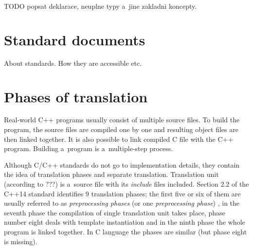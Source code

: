 \documentclass[nolot,nolof,nocover,printed]{fithesis3}
\begin{document}



\ifshowoldstuff


TODO popsat deklarace, neuplne typy a~jine zakladni koncepty.


\section{Standard documents}

About standards. How they are accessible etc.

\section{Phases of translation}
\label{txt:phases-of-translation}
Real-world C++ programs usually consist of multiple source files. To build the program, the source files are compiled one by one and resulting object files are then linked together. It is also possible to link compiled C file with the C++ program. Building a~program is a~multiple-step process.


Although C/C++ standards do not go to implementation details, they contain the idea of translation phases and separate translation. Translation unit (according to ???) is a~source file with its \textit{include} files included. Section 2.2 of the C++14 standard identifies 9 translation phases; the first five or six of them are usually referred to as \textit{preprocessing phases} (or one \textit{preprocessing phase}) , in the seventh phase the compilation of single translation unit takes place, phase number eight deals with template instantiation and in the ninth phase the whole program is linked together. In C language the phases are similar (but phase eight is missing).
\end{document}
